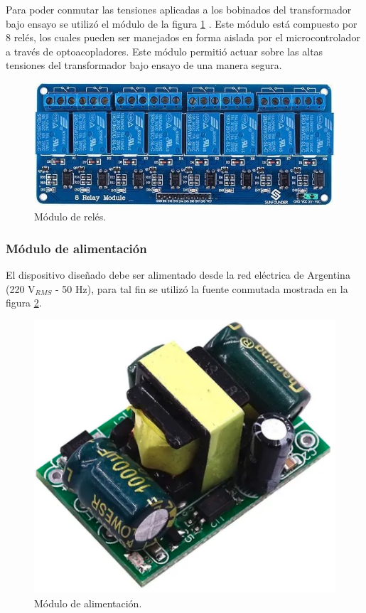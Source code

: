 Para poder conmutar las tensiones aplicadas a los bobinados del transformador bajo ensayo se utilizó el módulo de la figura \ref{fig:reles} . Este módulo está compuesto por 8 relés, los cuales pueden ser manejados en forma aislada por el microcontrolador a través de optoacopladores. Este módulo permitió actuar sobre las altas tensiones del transformador bajo ensayo de una manera segura.

\begin{figure}[htpb]
	\centering
	\includegraphics[scale=0.7]{./Figures/reles.jpeg}
	\caption{Módulo de relés.}
	\label{fig:reles}
\end{figure}

\pagebreak

\subsubsection{Módulo de alimentación}
\label{subsubsec:ModAlim}

El dispositivo diseñado debe ser alimentado desde la red eléctrica de Argentina (220 V$_{RMS}$ - 50 Hz), para tal fin se utilizó la fuente conmutada mostrada en la figura \ref{fig:fte}.

\begin{figure}[htpb]
	\centering
	\includegraphics[scale=0.6]{./Figures/fte.png}
	\caption{Módulo de alimentación.}
	\label{fig:fte}
\end{figure}

